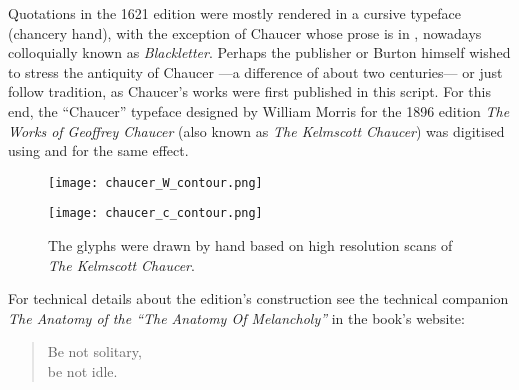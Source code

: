 Quotations in the 1621 edition were mostly rendered in a cursive typeface (chancery hand), with the exception of Chaucer whose prose is in , nowadays colloquially known as \emph{Blackletter}. Perhaps the publisher or Burton himself wished to stress the antiquity of Chaucer ---a difference of about two centuries--- or just follow tradition, as Chaucer's works were first published in this script. For this end, the \enquote{Chaucer} typeface designed by William Morris for the 1896 edition \emph{The Works of Geoffrey Chaucer} (also known as \emph{The Kelmscott Chaucer}) was digitised using \href{https://inkscape.org/}{} and \href{https://fontforge.org/en-US/}{} for the same effect.

%
\begin{figure}[H]%
  \centering
  \begin{minipage}{0.5\textwidth}%
    \texttt{[image: chaucer\_W\_contour.png]}%
  \end{minipage}%
  \qquad{}\begin{minipage}{0.22\textwidth}%
    \texttt{[image: chaucer\_c\_contour.png]}
  \end{minipage}%
  \caption*{\scriptsize{}The glyphs were drawn by hand based on high resolution scans of \emph{The Kelmscott Chaucer}.}
\end{figure}
For technical details about the edition's construction see the technical companion \emph{The Anatomy of the \enquote{The Anatomy Of Melancholy}} in the book's website:

\vspace{\baselineskip}

\clearpage{}%
\thispagestyle{empty}%
\vspace*{\fill}%
\begin{quote}%
\centering%
{%
\huge{}%
Be not solitary,\\ be not idle.%
}%
\end{quote}%
\vspace*{\fill}%
